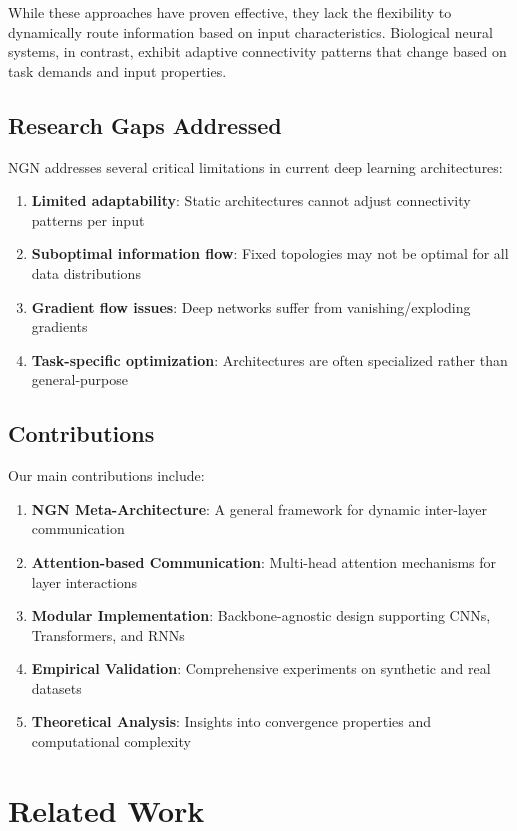 \documentclass[11pt]{article}
\begin{document}
While these approaches have proven effective, they lack the flexibility to dynamically route information based on input characteristics. Biological neural systems, in contrast, exhibit adaptive connectivity patterns that change based on task demands and input properties.

\subsection{Research Gaps Addressed}

NGN addresses several critical limitations in current deep learning architectures:

\begin{enumerate}
    \item \textbf{Limited adaptability}: Static architectures cannot adjust connectivity patterns per input
    \item \textbf{Suboptimal information flow}: Fixed topologies may not be optimal for all data distributions
    \item \textbf{Gradient flow issues}: Deep networks suffer from vanishing/exploding gradients
    \item \textbf{Task-specific optimization}: Architectures are often specialized rather than general-purpose
\end{enumerate}

\subsection{Contributions}

Our main contributions include:

\begin{enumerate}
    \item \textbf{NGN Meta-Architecture}: A general framework for dynamic inter-layer communication
    \item \textbf{Attention-based Communication}: Multi-head attention mechanisms for layer interactions
    \item \textbf{Modular Implementation}: Backbone-agnostic design supporting CNNs, Transformers, and RNNs
    \item \textbf{Empirical Validation}: Comprehensive experiments on synthetic and real datasets
    \item \textbf{Theoretical Analysis}: Insights into convergence properties and computational complexity
\end{enumerate}

\section{Related Work}
\end{document}
